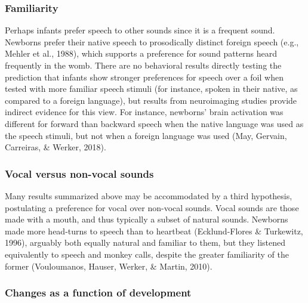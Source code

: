 \documentclass[man]{apa6}
\begin{document}
\subsubsection{Familiarity}\label{familiarity}

Perhaps infants prefer speech to other sounds since it is a frequent
sound. Newborns prefer their native speech to prosodically distinct
foreign speech (e.g., Mehler et al., 1988), which supports a preference
for sound patterns heard frequently in the womb. There are no behavioral
results directly testing the prediction that infants show stronger
preferences for speech over a foil when tested with more familiar speech
stimuli (for instance, spoken in their native, as compared to a foreign
language), but results from neuroimaging studies provide indirect
evidence for this view. For instance, newborns' brain activation was
different for forward than backward speech when the native language was
used as the speech stimuli, but not when a foreign language was used
(May, Gervain, Carreiras, \& Werker, 2018).

\subsubsection{Vocal versus non-vocal
sounds}\label{vocal-versus-non-vocal-sounds}

Many results summarized above may be accommodated by a third hypothesis,
postulating a preference for vocal over non-vocal sounds. Vocal sounds
are those made with a mouth, and thus typically a subset of natural
sounds. Newborns made more head-turns to speech than to heartbeat
(Ecklund-Flores \& Turkewitz, 1996), arguably both equally natural and
familiar to them, but they listened equivalently to speech and monkey
calls, despite the greater familiarity of the former (Vouloumanos,
Hauser, Werker, \& Martin, 2010).

\subsubsection{Changes as a function of
development}\label{changes-as-a-function-of-development}
\end{document}
